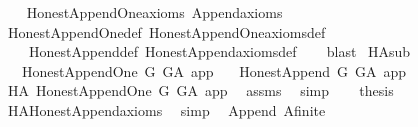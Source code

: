 \begin{isabellebody}
%
\isadelimproof
\ \ %
\endisadelimproof
%
\isatagproof
{}\isamarkupfalse%
\ Honest{\isacharunderscore}{\kern0pt}Append{\isacharunderscore}{\kern0pt}One{\isacharunderscore}{\kern0pt}axioms\ Append{\isacharunderscore}{\kern0pt}axioms\isanewline
\ \ \isamarkupfalse%
\ Honest{\isacharunderscore}{\kern0pt}Append{\isacharunderscore}{\kern0pt}One{\isacharunderscore}{\kern0pt}def\ Honest{\isacharunderscore}{\kern0pt}Append{\isacharunderscore}{\kern0pt}One{\isacharunderscore}{\kern0pt}axioms{\isacharunderscore}{\kern0pt}def\ \isanewline
\ \ \ \ Honest{\isacharunderscore}{\kern0pt}Append{\isacharunderscore}{\kern0pt}def\ Honest{\isacharunderscore}{\kern0pt}Append{\isacharunderscore}{\kern0pt}axioms{\isacharunderscore}{\kern0pt}def\isanewline
\ \ \isamarkupfalse%
\ blast%
\endisatagproof
{\isafoldproof}%
%
\isadelimproof
\isanewline
%
\endisadelimproof
\isanewline
{}\isamarkupfalse%
\ HA{}{\isacharunderscore}{\kern0pt}sub{\isacharcolon}{\kern0pt}\isanewline
\ \ \ {\isachardoublequoteopen}Honest{\isacharunderscore}{\kern0pt}Append{\isacharunderscore}{\kern0pt}One\ G\ G{\isacharunderscore}{\kern0pt}A\ app{\isachardoublequoteclose}\isanewline
\ \ \ {\isachardoublequoteopen}Honest{\isacharunderscore}{\kern0pt}Append\ G\ G{\isacharunderscore}{\kern0pt}A\ {\isacharbraceleft}{\kern0pt}app{\isacharbraceright}{\kern0pt}{\isachardoublequoteclose}\isanewline
%
\isadelimproof
%
\endisadelimproof
%
\isatagproof
{}\isamarkupfalse%
\ {\isacharminus}{\kern0pt}\isanewline
\ \ \isamarkupfalse%
\ HA{}{\isacharcolon}{\kern0pt}\ Honest{\isacharunderscore}{\kern0pt}Append{\isacharunderscore}{\kern0pt}One\ G\ G{\isacharunderscore}{\kern0pt}A\ app\ \isamarkupfalse%
\ assms\ \isamarkupfalse%
\ simp\isanewline
\ \ \isamarkupfalse%
\ {\isacharquery}{\kern0pt}thesis\ \isamarkupfalse%
\ HA{}{\isachardot}{\kern0pt}Honest{\isacharunderscore}{\kern0pt}Append{\isacharunderscore}{\kern0pt}axioms\ \isamarkupfalse%
\ simp\isanewline
{}\isamarkupfalse%
%
\endisatagproof
{\isafoldproof}%
%
\isadelimproof
%
\endisadelimproof
%
\isadelimdocument
%
\endisadelimdocument
%
\isatagdocument
%
\isamarkuptrue%
%
\endisatagdocument
{\isafolddocument}%
%
\isadelimdocument
%
\endisadelimdocument
{}\isamarkupfalse%
\ {\isacharparenleft}{\kern0pt}\ Append{\isacharparenright}{\kern0pt}\ A{\isacharunderscore}{\kern0pt}finite{\isacharcolon}{\kern0pt}\isanewline

\end{isabellebody}
